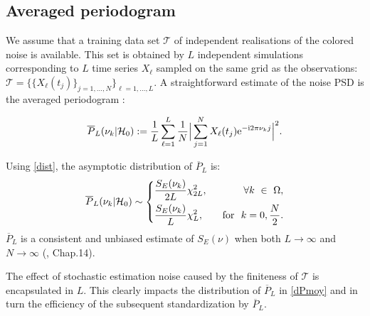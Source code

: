 \documentclass[journal]{IEEEtran}
\begin{document}
\subsection{Averaged periodogram}
We assume that a training data set $\mathcal{T}$ of independent realisations of the { colored }noise is available. This set  is obtained by $L$ independent simulations corresponding to $L$ time series $X_\ell$ sampled on the same grid as the observations:  $\mathcal{T}={\big\{}\{X_\ell(t_j)\}_{j=1,\hdots,N}{\big\}}_{\ell=1,\hdots,L}$.
A straightforward estimate of the noise PSD {  is} the averaged periodogram \cite{Bartlett_1950}:

$$ 
	\overline{P}_L(\nu_k |  {\cal{H}}_0)  : =  \frac{1}{L} \sum_{\ell=1}^{L}  \frac{1}{N} \Big| \sum_{j=1}^{N} X_\ell(t_j)\mathrm{e}^{-{\rm{i}}2\pi\nu_k j} \Big| ^2.
$$

Using \eqref{dist}, the asymptotic distribution of $\overline{P}_L$ {  is:}
\begin{equation}
 \overline{P}_L(\nu_k | {\cal{H}}_0)  \sim
  \left\{         
      \begin{aligned}
	  &\frac{S_E(\nu_k)}{2L}  \chi_{2L}^2,  ~ &\forall k ~ \in ~ \Omega, \\
	   &\frac{S_E(\nu_k)}{L}  \chi_{L}^2, ~ &\text{ for } ~ k = 0, \frac{N}{2}.
      \end{aligned}
    \right.
    \label{dPmoy}
\end{equation}
$\overline{P}_L$ is a consistent and unbiased estimate of $S_E(\nu)$ when both $L\rightarrow \infty$ and $N \rightarrow \infty$ (\cite{Proakis_1996}, Chap.14).

The effect of  stochastic estimation noise caused by the finiteness of $\mathcal{T}$ is encapsulated in $L$. This clearly impacts the distribution
of $\overline{P}_L$ in \eqref{dPmoy} and in turn the efficiency of the subsequent standardization by $\overline{P}_L$. 
\end{document}
